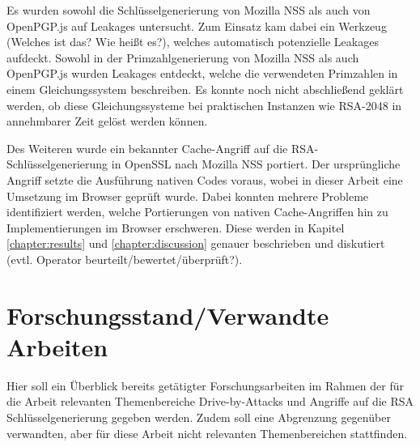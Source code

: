 


Es wurden sowohl die Schlüsselgenerierung von Mozilla NSS als auch von OpenPGP.js auf Leakages untersucht. 
Zum Einsatz kam dabei ein Werkzeug (Welches ist das? Wie heißt es?), welches automatisch potenzielle Leakages aufdeckt.
Sowohl in der Primzahlgenerierung von Mozilla NSS als auch OpenPGP.js wurden Leakages entdeckt, welche die verwendeten Primzahlen in einem Gleichungssystem beschreiben.
Es konnte noch nicht abschließend geklärt werden, ob diese Gleichungssysteme bei praktischen Instanzen wie RSA-2048 in annehmbarer Zeit gelöst werden können.

Des Weiteren wurde ein bekannter Cache-Angriff auf die RSA-Schlüsselgenerierung in OpenSSL nach Mozilla NSS portiert.
Der ursprüngliche Angriff setzte die Ausführung nativen Codes voraus, wobei in dieser Arbeit eine Umsetzung im Browser geprüft wurde.
Dabei konnten mehrere Probleme identifiziert werden, welche Portierungen von nativen Cache-Angriffen hin zu Implementierungen im Browser erschweren. 
Diese werden in Kapitel \ref{chapter:results} und \ref{chapter:discussion} genauer beschrieben und diskutiert (evtl. Operator beurteilt/bewertet/überprüft?).

\section{Forschungsstand/Verwandte Arbeiten}
\label{related_work}

Hier soll ein Überblick bereits getätigter Forschungsarbeiten im Rahmen der für die Arbeit relevanten Themenbereiche %
Drive-by-Attacks 
und Angriffe auf die RSA Schlüsselgenerierung gegeben werden. Zudem soll eine Abgrenzung gegenüber verwandten, aber für diese Arbeit nicht relevanten Themenbereichen stattfinden.


